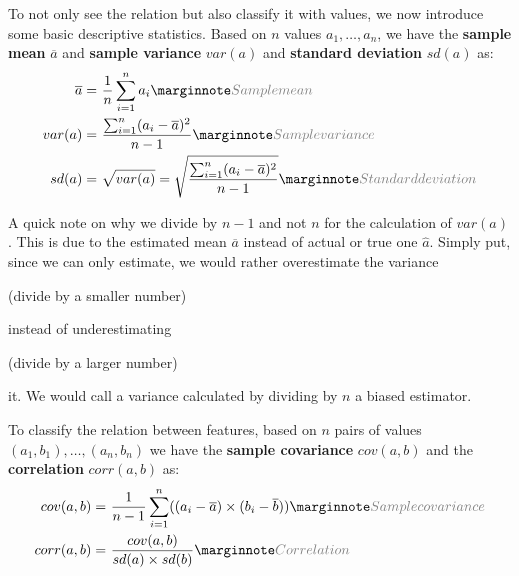 To not only see the relation but also classify it with values, we now introduce some basic descriptive statistics. Based on $n$ values $a_1, \dots, a_n$, we have the \textbf{sample mean} $\overline{a}$ and \textbf{sample variance} $var(a)$ and \textbf{standard deviation} $sd(a)$ as:
\begin{align*}
  \overline{a} = &\ \frac{1}{n}\sum_{i=1}^n a_i\sidenote{Sample mean}\allowdisplaybreaks\\
  var(a) = &\ \frac{\sum_{i=1}^n (a_i - \overline{a})^2}{n-1}\sidenote{Sample variance}\allowdisplaybreaks\\
  sd(a) = &\ \sqrt{var(a)} = \sqrt{\frac{\sum_{i=1}^n (a_i - \overline{a})^2}{n-1}}\sidenote{Standard deviation}
\end{align*}

A quick note on why we divide by $n-1$ and not $n$ for the calculation of $var(a)$. This is due to the estimated mean $\overline{a}$ instead of actual or true one $\hat{a}$. Simply put, since we can only estimate, we would rather overestimate the variance \begin{note}(divide by a smaller number)\end{note} instead of underestimating \begin{note}(divide by a larger number)\end{note} it. We would call a variance calculated by dividing by $n$ a biased estimator.

To classify the relation between features, based on $n$ pairs of values $(a_1, b_1), \dots, (a_n, b_n)$ we have the \textbf{sample covariance} $cov(a, b)$ and the \textbf{correlation} $corr(a, b)$ as: 
\begin{align*}
  cov(a, b) = &\ \frac{1}{n-1}\sum_{i=1}^n ((a_i - \overline{a})\times(b_i - \overline{b}))\sidenote{Sample covariance}\allowdisplaybreaks\\
  corr(a, b) = &\ \frac{cov(a, b)}{sd(a)\times sd(b)}\sidenote{Correlation}
\end{align*}

